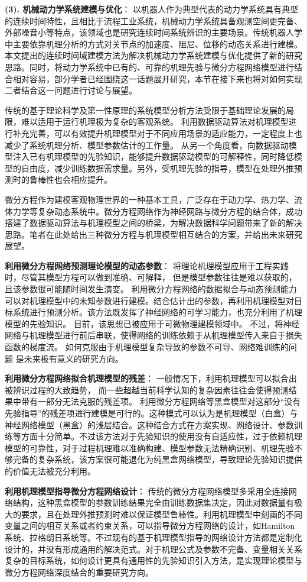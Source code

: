 \textbf{(3). 机械动力学系统建模与优化}：
以机器人作为典型代表的动力学系统具有典型的连续时间特性，且相比于流程工业系统，机械动力学系统具备观测空间更完备、外部噪音小等特点，该领域也是研究连续时间系统辨识的主要场景。传统机器人学中主要依靠机理分析的方式对关节点的加速度、阻尼、位移的动态关系进行建模。本文提出的连续时间域建模方法为解决机械动力学系统建模与优化提供了新的研究思路。同时，将动力学系统中已有的、可靠的机理先验与微分方程网络模型进行结合相对容易，部分学者已经围绕这一话题展开研究\cite{zhong2019symplectic,zhong2019symplectic}，本节在接下来也将对如何实现二者结合这一问题进行讨论与展望。

传统的基于理论科学及第一性原理的系统模型分析方法受限于基础理论发展的局限，难以适用于运行机理极为复杂的客观系统。
利用数据驱动算法对机理模型进行补充完善，可以有效提升机理模型对于不同应用场景的适应能力，一定程度上也减少了系统机理分析、模型参数估计的工作量。
从另一个角度看，向数据驱动模型注入已有机理模型的先验知识，能够提升数据驱动模型的可解释性，同时降低模型的自由度，减少训练数据需求量。另外，受机理先验的指导，模型在处理外推预测时的鲁棒性也会相应提升。

微分方程作为建模客观物理世界的一种基本工具，广泛存在于动力学、热力学、流体力学等复杂动态系统中。微分方程网络作为神经网路与微分方程的结合体，成功搭建了数据驱动算法与机理模型之间的桥梁，为解决数据科学问题带来了新的解决思路。笔者在此处给出三种微分方程与机理模型相互结合的方案，并给出未来研究展望。

\textbf{利用微分方程网络预测理论模型的动态参数}：
将理论机理模型应用于工程实践时，尽管其模型方程可以做到准确、可解释，
但是模型参数往往是难以获取的，且该参数很可能随时间发生演变。
利用微分方程网络的数据拟合与动态预测能力可以对机理模型中的未知参数进行建模。结合估计出的参数，再利用机理模型对目标系统进行预测分析。该方法既发挥了神经网络的可学习能力，也充分利用了机理模型的先验知识。
目前，该思想已被应用于可微物理建模领域中\cite{takahashi2021differentiable}。
不过，将神经网络与机理模型进行前后串联，使得网络的训练依赖于从机理模型传入来自于损失函数的梯度流。
如何克服由于机理模型复杂导致的参数不可导、网络难训练的问题
是未来极有意义的研究方向。

\textbf{利用微分方程网络拟合机理模型的残差}：
一般情况下，利用机理模型可以拟合出被辨识过程的大致趋势，
而一些超越当前科学认知的复杂因素往往会使得预测结果中带有一部分无法克服的残差项。
利用微分方程网络等黑盒模型对这部分“没有先验指导”的残差项进行建模是可行的。这种模式可以认为是机理模型（白盒）与神经网络模型（黑盒）的浅层结合。这种结合方式在方案实现、网络设计、参数训练等方面十分简单。不过该方法对于先验知识的使用没有自适应性，过于依赖机理模型的可靠性，对于过程机理难以准确构建、模型参数无法精确识别、机理先验不够完备的复杂系统，该方案很可能退化为纯黑盒网络模型，导致理论先验知识提供的价值无法被充分利用。

\textbf{利用机理模型指导微分方程网络设计}：
传统的微分方程网络模型多采用全连接网络结构，这种黑盒模型的参数训练结果完全由训练数据集决定，因此对数据量有极大的要求，且在处理外推预测时难以保证模型鲁棒性。利用机理模型中刻画的不同变量之间的相互关系或者约束关系，可以指导微分方程网络的设计，如Hamilton系统、拉格朗日系统等。不过现有的基于机理模型指导的网络设计方法都是定制化设计的，并没有形成通用的解决范式。对于机理公式及参数不完备、变量相关关系复杂的目标系统，如何设计更具有通用性的先验知识引入方法，是实现理论模型与微分方程网络深度结合的重要研究方向。


